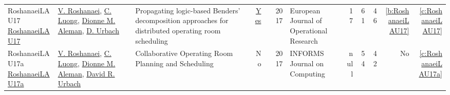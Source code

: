 {\begin{longtable}{>{\raggedright\arraybackslash}p{3cm}>{\raggedright\arraybackslash}p{6cm}>{\raggedright\arraybackslash}p{6.5cm}rrrp{2.5cm}rrrrr}
RoshanaeiLAU17 \href{http://dx.doi.org/10.1016/j.ejor.2016.08.024}{RoshanaeiLAU17} & \hyperref[auth:a737]{V. Roshanaei}, \hyperref[auth:a946]{C. Luong}, \hyperref[auth:a913]{Dionne M. Aleman}, \hyperref[auth:a947]{D. Urbach} & Propagating logic-based Benders' decomposition approaches for distributed operating room scheduling & \href{works/RoshanaeiLAU17.pdf}{Yes} & \cite{RoshanaeiLAU17} & 2017 & European Journal of Operational Research & 17 & 61 & 46 & \ref{b:RoshanaeiLAU17} & \ref{c:RoshanaeiLAU17}\\
RoshanaeiLAU17a \href{http://dx.doi.org/10.1287/ijoc.2017.0745}{RoshanaeiLAU17a} & \hyperref[auth:a737]{V. Roshanaei}, \hyperref[auth:a946]{C. Luong}, \hyperref[auth:a913]{Dionne M. Aleman}, \hyperref[auth:a914]{David R. Urbach} & Collaborative Operating Room Planning and Scheduling & No & \cite{RoshanaeiLAU17a} & 2017 & INFORMS Journal on Computing & null & 54 & 42 & No & \ref{c:RoshanaeiLAU17a}\\
\end{longtable}
}

